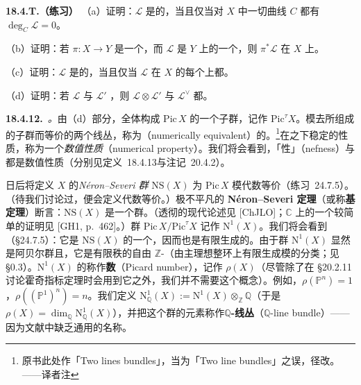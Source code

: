 \textbf{18.4.T.（练习）}\quad
（a）证明：$\mathscr{L}$ 是\trNumericallyTrivial{}的，当且仅当对 $X$ 中一切\emph{\trIntegral}曲线 $C$ 都有 $\deg_C\mathscr{L}=0$。

（b）证明：若 $\pi\colon X\to Y$ 是一个\trProper\trMorphism，而 $\mathscr{L}$ 是 $Y$ 上的一个\trNumericallyTrivial\trInvertibleSheaf，则 $\pi^*\mathscr{L}$ 在 $X$ 上\trNumericallyTrivial。

（c）证明：$\mathscr{L}$ 是\trNumericallyTrivial{}的，当且仅当 $\mathscr{L}$ 在 $X$ 的每个\trIrreducibleComponent{}上都\trNumericallyTrivial。

（d）证明：若 $\mathscr{L}$ 与 $\mathscr{L}'$ \trNumericallyTrivial，则 $\mathscr{L}\otimes\mathscr{L}'$ 与 $\mathscr{L}^\vee$ 都\trNumericallyTrivial。

\textbf{18.4.12.}\ \emph{\trNumericallyEquivalent。}\quad 由（d）部分，\trNumericallyTrivial\trInvertibleSheaf{}全体构成 $\mathrm{Pic}\,X$ 的一个子群，记作 $\mathrm{Pic}^\tau X$。模去\trNumericallyTrivial\trLineBundle{}所组成的子群而等价的两个线丛，称为\textbf{\trNumericallyEquivalent}（numerically equivalent）的。\footnote{原书此处作「Two lines bundles」，当为「Two line bundles」之误，径改。——译者注}在\trNumericallyEquivalent{}之下稳定的\trInvertibleSheaf{}性质，称为一个\emph{数值性质}（numerical property）。我们将会看到，「\trNef{}性」（nefness）与\trAmpleness{}都是数值性质（分别见\mbox{定义~18.4.13}与\mbox{注记~20.4.2}）。

日后将定义 $X$ 的\emph{N\'eron--Severi 群} $\mathrm{NS}(X)$ 为 $\mathrm{Pic}\,X$ 模代数等价（\mbox{练习~24.7.5}）。（待我们讨论过\trFlatness，便会定义代数等价。）极不平凡的 \textbf{N\'eron--Severi 定理}（或称\textbf{基定理}）断言：$\mathrm{NS}(X)$ 是一个\trFinitelyGenerated{}群。（透彻的现代论述见 [ChJLO]；$\mathbb{C}$ 上的一个较简单的证明见 [GH1, p.~462]。）群 $\mathrm{Pic}\,X/\mathrm{Pic}^\tau X$ 记作 $\mathrm{N}^1(X)$。我们将会看到（\S24.7.5）：它是 $\mathrm{NS}(X)$ 的一个\trQuotient，因而也是有限生成的。由于群 $\mathrm{N}^1(X)$ 显然是阿贝尔群且\trTorsionFree，它是有限秩的自由 $\mathbb{Z}$-\trModule（由主理想整环上有限生成模的分类；见 \S0.3）。$\mathrm{N}^1(X)$ 的\trRank{}称作\textbf{\trPicard{}数}（Picard number），记作 $\rho(X)$（尽管除了在 \S20.2.11 讨论霍奇指标定理时会用到它之外，我们并不需要这个概念）。例如，$\rho(\mathbb{P}^n)=1$，$\rho((\mathbb{P}^1)^n)=n$。我们定义 $\mathrm{N}^1_{\mathbb{Q}}(X):=\mathrm{N}^1(X)\otimes_{\mathbb{Z}}\mathbb{Q}$（于是 $\rho(X)=\dim_{\mathbb{Q}}\mathrm{N}^1_{\mathbb{Q}}(X)$），并把这个群的元素称作\textbf{$\mathbb{Q}$-线丛}（$\mathbb{Q}$-line bundle）——因为文献中缺乏通用的名称。

